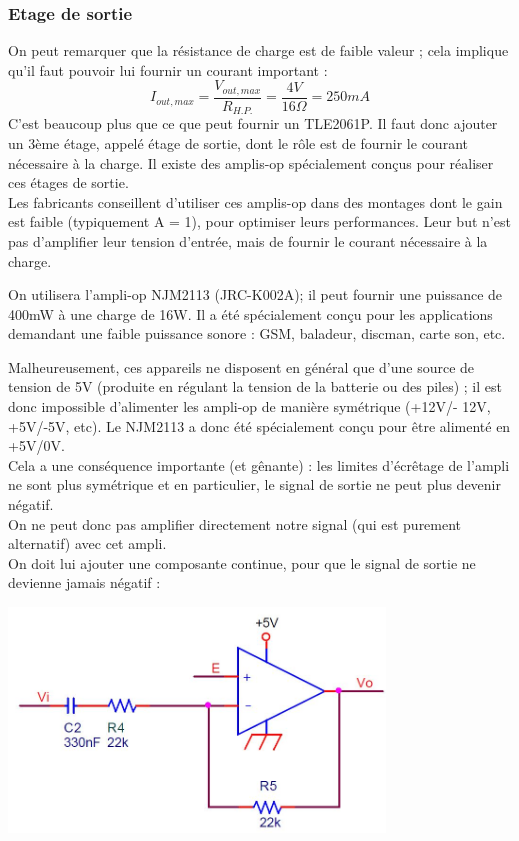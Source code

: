 \documentclass{../template/labo}
\begin{document}
\subsubsection{Etage de sortie}
On peut remarquer que la résistance de charge est de faible valeur ; cela implique qu'il faut pouvoir lui fournir un courant important :
$$I_{out,max}=\frac{V_{out,max}}{R_{H.P.}}=\frac{4V}{16\Omega}=250mA$$
C'est beaucoup plus que ce que peut fournir un TLE2061P. Il faut donc ajouter un 3ème étage, appelé étage de sortie, dont le rôle est de fournir le courant nécessaire à la charge. Il existe des amplis-op spécialement conçus pour réaliser ces étages de sortie.\\
Les fabricants conseillent d'utiliser ces amplis-op dans des montages dont le gain est faible (typiquement A = 1), pour optimiser leurs performances. Leur but n'est pas d'amplifier leur tension d'entrée, mais de fournir le courant
nécessaire à la charge.

On utilisera l'ampli-op NJM2113 (JRC-K002A); il peut fournir une puissance de 400mW à une charge de 16W. Il a été spécialement conçu pour les applications demandant une faible puissance sonore : GSM, baladeur, discman, carte son, etc.

Malheureusement, ces appareils ne disposent en général que d'une source de tension de 5V (produite en régulant la tension de la batterie ou des piles) ; il est donc impossible d'alimenter les ampli-op de manière symétrique (+12V/- 12V, +5V/-5V, etc). Le NJM2113 a donc été spécialement conçu pour être alimenté en +5V/0V.\\
Cela a une conséquence importante (et gênante) : les limites d'écrêtage de l'ampli ne sont plus symétrique et en particulier, le signal de sortie ne peut plus devenir négatif.\\
On ne peut donc pas amplifier directement notre signal (qui est purement alternatif) avec cet ampli.\\
On doit lui ajouter une composante continue, pour que le signal de sortie ne devienne jamais négatif :
\begin{center}
\includegraphics[width=10cm]{figures/AOPetage3}
\end{center}
\end{document}

